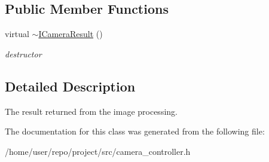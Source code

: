 \subsection*{Public Member Functions}
\begin{DoxyCompactItemize}
\item 
\mbox{\label{classICameraResult_a6c8f4f6c3748c00236bd588cf9410f8b}} 
virtual \hyperlink{classICameraResult_a6c8f4f6c3748c00236bd588cf9410f8b}{$\sim$\+I\+Camera\+Result} ()
\begin{DoxyCompactList}\small\item\em destructor \end{DoxyCompactList}\end{DoxyCompactItemize}


\subsection{Detailed Description}
The result returned from the image processing. 

The documentation for this class was generated from the following file\+:\begin{DoxyCompactItemize}
\item 
/home/user/repo/project/src/camera\+\_\+controller.\+h\end{DoxyCompactItemize}
